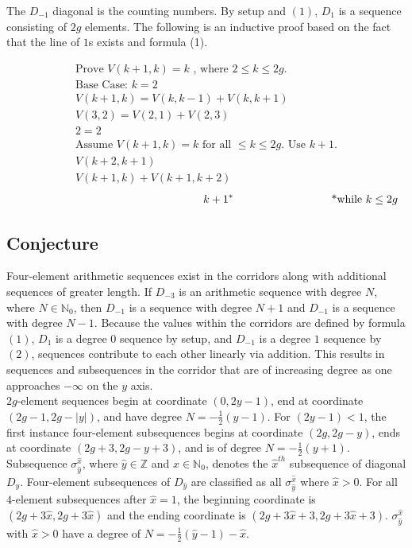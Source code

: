 \documentclass{article}
\newcommand\tab[1][1cm]{\hspace*{#1}}
\newcommand*{\set}[1]{\mathbb{#1}}
\theoremstyle{definition}
\begin{document}
    \noindent The $D_{-1}$ diagonal is the counting numbers.
 By setup and $(1)$, $D_{1}$ is a sequence consisting of $2g$ elements.
 The following is an inductive proof based on the fact that the line of $1$s exists and formula (1).

\begin{gather*}
  \text{Prove   } V(k+1, k) = k\text{ , where } 2 \leq k \leq 2g\text{.} \\
  \text{Base Case: }k = 2\\
  V(k+1,k) = V(k,k-1) + V(k,k+1)\\
  V(3,2) = V(2,1) + V(2,3)\\
  2 = 2\\
  \text{Assume } V(k+1, k) = k \text{ for all } \leq k \leq 2g \text{. }
  \text{Use } k+1 \text{.}\\
  V(k+2,k+1)\\
  V(k+1,k) + V(k+1, k+2)
\end{gather*}
\begin{align}
  \tab\tab\tab\tab\tab\tab k + 1^* \tab\tab\tab \text{ *while } k \leq 2g
 \end{align}
    
  \subsection*{Conjecture}
  
  \tab Four-element arithmetic sequences exist in the corridors along with additional sequences of greater length. If $D_{-3}$ is an 
  arithmetic sequence with degree $N$, where $N \in \set{N}_0$, then
  $D_{-1}$ is a sequence with degree $N+1$ and $D_{-1}$ is a sequence with degree $N-1$. Because the values within the corridors are defined by formula $(1)$, 
  $D_{1}$ is a degree $0$ sequence by setup, and $D_{-1}$ is a degree $1$ sequence by $(2)$,
  sequences contribute to each other linearly via addition. This results in sequences and subsequences in the corridor that are of increasing degree 
  as one approaches $-\infty$ on the $y$ axis.\\
  \tab $2g$-element sequences begin at coordinate $(0,2y-1)$, end at coordinate $(2g-1, 2g-|y|)$, and have degree $N = -\frac{1}{2}(y - 1)$. 
  For $(2y-1) < 1$, the first instance four-element subsequences begins at coordinate $(2g, 2g-y)$, ends at coordinate $(2g + 3, 2g-y + 3)$, and is of degree
  $N = -\frac{1}{2}(y + 1)$.\\
  \tab Subsequence $\sigma_{\hat{y}}^{\hat{x}}$, where ${\hat{y} \in \set{Z}}$ and ${\hat{x} \in \set{N}_0}$, denotes the $\hat{x}^{th}$ 
  subsequence of diagonal $D_{\hat{y}}$. Four-element subsequences of $D_{\hat{y}}$ are classified as all $\sigma_{\hat{y}}^{\hat{x}}$ where 
  $\hat{x} > 0$. For all $4$-element subsequences after $\hat{x} = 1$, the beginning coordinate is $(2g + 3\hat{x}, 2g+3\hat{x})$ and 
  the ending coordinate is $(2g + 3\hat{x}+3, 2g+3\hat{x}+3)$. 
  $\sigma_{\hat{y}}^{\hat{x}}$ with $\hat{x} > 0$ have a degree of $N = -\frac{1}{2}(\hat{y} - 1) - \hat{x}$.
  


 
  
  
  
  

		
  
  
\end{document}
